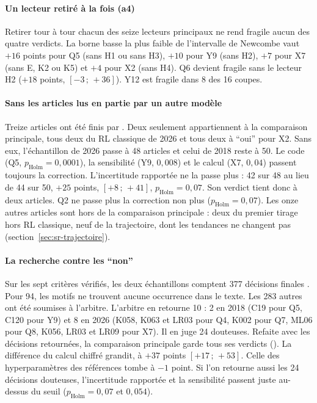 \paragraph{Un lecteur retiré à la fois (a4)}
Retirer tour à tour chacun des seize lecteurs principaux ne rend fragile aucun des quatre verdicts. La
borne basse la plus faible de l'intervalle de Newcombe vaut $+16$ points pour Q5 (sans H1 ou sans H3),
$+10$ pour Y9 (sans H2), $+7$ pour X7 (sans E, K2 ou K5) et $+4$ pour X2 (sans H4). Q6 devient fragile
sans le lecteur H2 ($+18$ points, $[-3\,;\,+36]$). Y12 est fragile dans 8 des 16 coupes.

\paragraph{Sans les articles lus en partie par un autre modèle}
Treize articles ont été finis par . Deux seulement appartiennent à la
comparaison principale, tous deux du RL classique de 2026 et tous deux à \enquote{oui} pour X2. Sans
eux, l'échantillon de 2026 passe à 48 articles et celui de 2018 reste à 50. Le code (Q5,
$p_{\text{Holm}} = 0{,}0001$), la sensibilité (Y9, $0{,}008$) et le calcul (X7, $0{,}04$) passent
toujours la correction. L'incertitude rapportée ne la passe plus : 42 sur 48 au lieu de 44 sur 50,
$+25$ points, $[+8\,;\,+41]$, $p_{\text{Holm}} = 0{,}07$. Son verdict tient donc à deux articles. Q2
ne passe plus la correction non plus ($p_{\text{Holm}} = 0{,}07$). Les onze autres articles sont hors
de la comparaison principale : deux du premier tirage hors RL classique, neuf de la trajectoire, dont
les tendances ne changent pas (section~\ref{sec:sr-trajectoire}).

\paragraph{La recherche contre les \enquote{non}}
Sur les sept critères vérifiés, les deux échantillons comptent 377 décisions finales . Pour
94, les motifs ne trouvent aucune occurrence dans le texte. Les 283 autres ont été
soumises à l'arbitre. L'arbitre en retourne 10 : 2 en 2018 (C19 pour Q5, C120 pour Y9) et 8 en 2026 (K058,
K063 et LR03 pour Q4, K002 pour Q7, ML06 pour Q8, K056, LR03 et LR09 pour X7). Il en juge 24 douteuses.
Refaite avec les décisions retournées, la comparaison principale garde tous ses verdicts
(). La différence du calcul chiffré grandit, à $+37$ points $[+17\,;\,+53]$.
Celle des hyperparamètres des références tombe à $-1$ point. Si l'on retourne aussi les 24 décisions
douteuses, l'incertitude rapportée et la sensibilité passent juste au-dessus du seuil
($p_{\text{Holm}} = 0{,}07$ et $0{,}054$).

